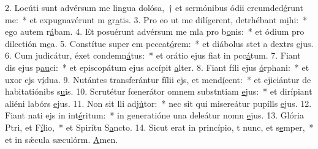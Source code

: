 2. Locúti sunt advérsum me lingua dolósa,~† et sermónibus ódii crcumded\uline{é}runt me:~* et expugnavérunt m gr\uline{a}tis.
3. Pro eo ut me dilígerent, detrhébant m\uline{i}hi:~* ego autem r\uline{á}bam.
4. Et posuérunt advérsum me mla pro b\uline{o}nis:~* et ódium pro dilectión m\uline{e}a.
5. Constítue super em peccat\uline{ó}rem:~* et diábolus stet a dextrs \uline{e}jus.
6. Cum judicátur, éxet condemn\uline{á}tus:~* et orátio ejus fiat in pcc\uline{á}tum.
7. Fiant dis ejus p\uline{au}ci:~* et episcopátum ejus accípit \uline{a}lter.
8. Fiant fíli ejus \uline{ó}rphani:~* et uxor ejs v\uline{í}dua.
9. Nutántes transferántur fílii ejs, et mend\uline{í}cent:~* et ejiciántur de habitatiónibs s\uline{u}is.
10. Scrutétur fœnerátor omnem substntiam \uline{e}jus:~* et dirípiant aliéni labórs \uline{e}jus.
11. Non sit lli adj\uline{ú}tor:~* nec sit qui misereátur pupílls \uline{e}jus.
12. Fiant nati ejs in int\uline{é}ritum:~* in generatióne una deleátur nomn \uline{e}jus.
13. Glória Ptri, et F\uline{í}lio,~* et Spirítu S\uline{a}ncto.
14. Sicut erat in princípio, t nunc, et s\uline{e}mper,~* et in sǽcula sæculórm. \uline{A}men.
